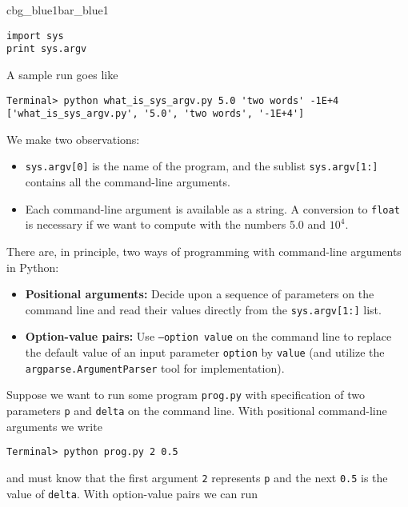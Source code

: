 \documentclass[graybox,sectrefs,envcountresetchap,open=right,final]{svmonodo}
\newenvironment{_pro_tight}[2]{
   \def\FrameCommand{\color{#2}\vrule width 1mm\normalcolor\colorbox{#1}}
   \FrameRule0.6pt\MakeFramed {\advance\hsize-2mm\FrameRestore}\vskip3mm}
   {\vskip0mm\endMakeFramed}
\newenvironment{pro}[2]{
\bgroup\rmfamily
\fboxsep=0mm\relax
\begin{_pro_tight}{#1}{#2}
\list{}{\parsep=-2mm\parskip=0mm\topsep=0pt\leftmargin=2mm
\rightmargin=2\leftmargin\leftmargin=4pt\relax}
\item\relax}
{\endlist\end{_pro_tight}\egroup}
\begin{document}
\begin{pro}{cbg_blue1}{bar_blue1}\begin{Verbatim}[numbers=none,fontsize=\fontsize{9pt}{9pt},baselinestretch=0.95,xleftmargin=2mm]
import sys
print sys.argv
\end{Verbatim}
\end{pro}
\noindent
A sample run goes like

\begin{Verbatim}[frame=lines,label=\fbox{{\tiny Terminal}},framesep=2.5mm,framerule=0.7pt,fontsize=\fontsize{9pt}{9pt}]
Terminal> python what_is_sys_argv.py 5.0 'two words' -1E+4
['what_is_sys_argv.py', '5.0', 'two words', '-1E+4']
\end{Verbatim}
We make two observations:

\begin{itemize}
 \item \texttt{sys.argv[0]} is the name of the program,
   and the sublist \texttt{sys.argv[1:]} contains all the command-line arguments.

 \item Each command-line argument is available as a string. A conversion to
   \texttt{float} is necessary if we want to compute with the numbers 5.0 and
   $10^4$.
\end{itemize}

\noindent
There are, in principle, two ways of programming with
command-line arguments in Python:

\begin{itemize}
 \item \textbf{Positional arguments:} Decide upon a sequence of parameters
   on the command line and read
   their values directly from the \texttt{sys.argv[1:]} list.

 \item \textbf{Option-value pairs:}  Use \texttt{--option value} on
   the command line to replace the default value of an input parameter
   \texttt{option} by \texttt{value} (and utilize the \texttt{argparse.ArgumentParser} tool
   for implementation).
\end{itemize}

\noindent
Suppose we want to run some program \texttt{prog.py} with
specification of two parameters \texttt{p} and \texttt{delta} on the command line.
With positional command-line arguments we write

\begin{Verbatim}[frame=lines,label=\fbox{{\tiny Terminal}},framesep=2.5mm,framerule=0.7pt,fontsize=\fontsize{9pt}{9pt}]
Terminal> python prog.py 2 0.5
\end{Verbatim}
and must know that the first argument \texttt{2} represents \texttt{p} and the
next \texttt{0.5} is the value of \texttt{delta}.
With option-value pairs we can run
\end{document}
